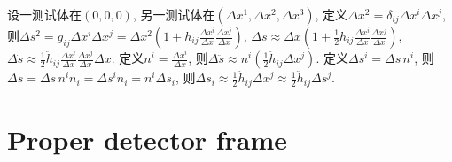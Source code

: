 设一测试体在$(0,0,0)$, 另一测试体在$(\Delta x^1,\Delta x^2,\Delta x^3)$, 定义$\Delta x^2=\delta_{ij}\Delta x^i\Delta x^j$, 则$\Delta s^2=g_{ij}\Delta x^i\Delta x^j=\Delta x^2(1+h_{ij}\frac{\Delta x^i}{\Delta x}\frac{\Delta x^j}{\Delta x})$, $\Delta s\approx\Delta x(1+\frac{1}{2}h_{ij}\frac{\Delta x^i}{\Delta x}\frac{\Delta x^j}{\Delta x})$, $\Delta \ddot{s}\approx\frac{1}{2}\ddot{h}_{ij}\frac{\Delta x^i}{\Delta x}\frac{\Delta x^j}{\Delta x}\Delta x$. 定义$n^i=\frac{\Delta x^i}{\Delta x}$, 则$\Delta \ddot{s}\approx n^i(\frac{1}{2}\ddot{h}_{ij}\Delta x^j)$. 定义$\Delta s^i=\Delta s\,n^i$, 则$\Delta s=\Delta s\,n^in_i=\Delta s^in_i=n^i\Delta s_i$, 则$\Delta s_i\approx \frac{1}{2}\ddot{h}_{ij}\Delta x^j\approx\frac{1}{2}\ddot{h}_{ij}\Delta s^j$.

\section{Proper detector frame}

